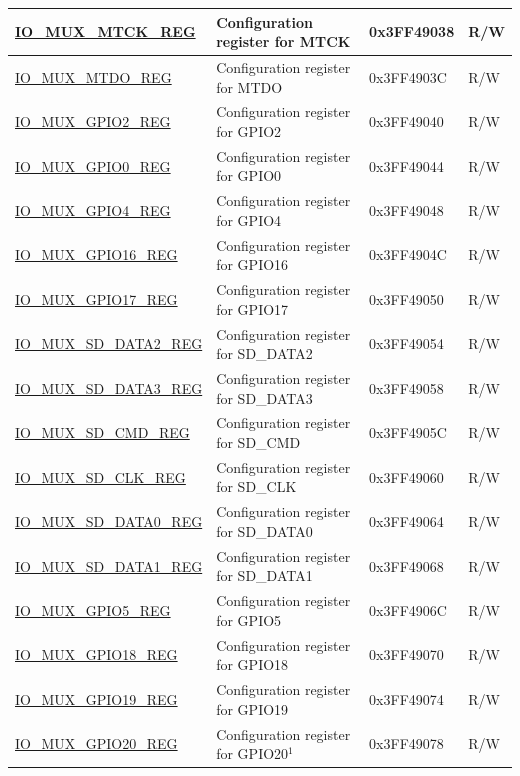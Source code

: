 \begin{longtable}{ | p{5cm} | p{7.5cm} | p{2cm} | p{1cm} | }
\hyperref[regdesc:IOMUXnREG]{IO\_MUX\_MTCK\_REG} & Configuration register for MTCK & 0x3FF49038 & R/W \\ \hline
\hyperref[regdesc:IOMUXnREG]{IO\_MUX\_MTDO\_REG} & Configuration register for MTDO & 0x3FF4903C & R/W \\ \hline
\hyperref[regdesc:IOMUXnREG]{IO\_MUX\_GPIO2\_REG} & Configuration register for GPIO2 & 0x3FF49040 & R/W \\ \hline
\hyperref[regdesc:IOMUXnREG]{IO\_MUX\_GPIO0\_REG} & Configuration register for GPIO0 & 0x3FF49044 & R/W \\ \hline
\hyperref[regdesc:IOMUXnREG]{IO\_MUX\_GPIO4\_REG} & Configuration register for GPIO4 & 0x3FF49048 & R/W \\ \hline
\hyperref[regdesc:IOMUXnREG]{IO\_MUX\_GPIO16\_REG} & Configuration register for GPIO16 & 0x3FF4904C & R/W \\ \hline
\hyperref[regdesc:IOMUXnREG]{IO\_MUX\_GPIO17\_REG} & Configuration register for GPIO17 & 0x3FF49050 & R/W \\ \hline
\hyperref[regdesc:IOMUXnREG]{IO\_MUX\_SD\_DATA2\_REG} & Configuration register for SD\_DATA2 & 0x3FF49054 & R/W \\ \hline
\hyperref[regdesc:IOMUXnREG]{IO\_MUX\_SD\_DATA3\_REG} & Configuration register for SD\_DATA3 & 0x3FF49058 & R/W \\ \hline
\hyperref[regdesc:IOMUXnREG]{IO\_MUX\_SD\_CMD\_REG} & Configuration register for SD\_CMD & 0x3FF4905C & R/W \\ \hline
\hyperref[regdesc:IOMUXnREG]{IO\_MUX\_SD\_CLK\_REG} & Configuration register for SD\_CLK & 0x3FF49060 & R/W \\ \hline
\hyperref[regdesc:IOMUXnREG]{IO\_MUX\_SD\_DATA0\_REG} & Configuration register for SD\_DATA0 & 0x3FF49064 & R/W \\ \hline
\hyperref[regdesc:IOMUXnREG]{IO\_MUX\_SD\_DATA1\_REG} & Configuration register for SD\_DATA1 & 0x3FF49068 & R/W \\ \hline
\hyperref[regdesc:IOMUXnREG]{IO\_MUX\_GPIO5\_REG} & Configuration register for GPIO5 & 0x3FF4906C & R/W \\ \hline
\hyperref[regdesc:IOMUXnREG]{IO\_MUX\_GPIO18\_REG} & Configuration register for GPIO18 & 0x3FF49070 & R/W \\ \hline
\hyperref[regdesc:IOMUXnREG]{IO\_MUX\_GPIO19\_REG} & Configuration register for GPIO19 & 0x3FF49074 & R/W \\ \hline
\hyperref[regdesc:IOMUXnREG]{IO\_MUX\_GPIO20\_REG} & Configuration register for GPIO20$^1$ & 0x3FF49078 & R/W \\ \hline

\end{longtable}
